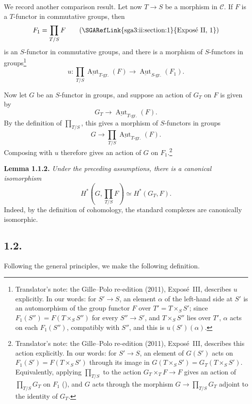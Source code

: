 We record another comparison result. Let now \(T\to S\) be a morphism in
\(\mathscr C\). If \(F\) is a \(T\)-functor in commutative groups,
then
\[
 F_1=\prod_{T/S}F
 \qquad(\text{\SGARefLink{sga3:ii:section:1}{Expos\'e~II, 1}})
\]
is an \(S\)-functor in commutative groups, and there is a morphism of
\(S\)-functors in groups\footnote{Translator's note: the Gille--Polo re-edition (2011), Exposé~III, describes \(u\)
explicitly. In our words: for \(S'\to S\), an element \(\alpha\) of the
left-hand side at \(S'\) is an automorphism of the group functor \(F\) over
\(T'=T\times_SS'\); since \(F_1(S'')=F(T\times_SS'')\) for every
\(S''\to S'\), and \(T\times_SS''\) lies over \(T'\), \(\alpha\) acts on
each \(F_1(S'')\), compatibly with \(S''\), and this is \(u(S')(\alpha)\).}
\[
 u:\prod_{T/S}
 \underline{\operatorname{Aut}}_{T\text{-gr.}}(F)
 \longrightarrow
 \underline{\operatorname{Aut}}_{S\text{-gr.}}(F_1).
\]

Now let \(G\) be an \(S\)-functor in groups, and suppose an action of
\(G_T\) on \(F\) is given by
\[
 G_T\longrightarrow
 \underline{\operatorname{Aut}}_{T\text{-gr.}}(F).
\]
By the definition of \(\prod_{T/S}\), this gives a morphism of
\(S\)-functors in groups
\[
 G\longrightarrow
 \prod_{T/S}\underline{\operatorname{Aut}}_{T\text{-gr.}}(F).
\]
Composing with \(u\) therefore gives an action of \(G\) on
\(F_1\).\footnote{Translator's note: the Gille--Polo re-edition (2011), Exposé~III, describes this action explicitly. In
our words: for \(S'\to S\), an element of \(G(S')\) acts on
\(F_1(S')=F(T\times_SS')\) through its image in
\(G(T\times_SS')=G_T(T\times_SS')\). Equivalently, applying
\(\prod_{T/S}\) to the action \(G_T\times_TF\to F\) gives an action of
\(\prod_{T/S}G_T\) on \(F_1\) (), and \(G\) acts through the
morphism \(G\to\prod_{T/S}G_T\) adjoint to the identity of \(G_T\).}

\medskip
\noindent{}\textbf{Lemma 1.1.2.}
\textit{Under the preceding assumptions, there is a canonical
isomorphism}
\[
 H^\ast\!\left(G,\prod_{T/S}F\right)
 \simeq H^\ast(G_T,F).
\]
Indeed, by the definition of cohomology, the standard complexes are
canonically isomorphic.

\subsection*{1.2.}
Following the general principles, we make the following definition.

